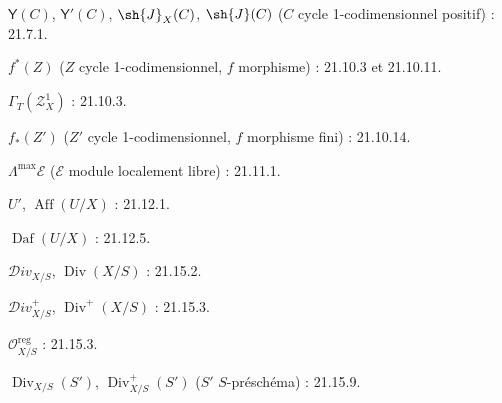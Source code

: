 $\boldsymbol{\mathsf{Y}}(C)$, $\boldsymbol{\mathsf{Y}}'(C)$, $\sh{J}_X(C)$, $\sh{J}(C)$
($C$ cycle 1-codimensionnel positif) : 21.7.1.

$f^*(Z)$ ($Z$ cycle 1-codimensionnel, $f$ morphisme) : 21.10.3 et 21.10.11.

$\varGamma_T(\mathscr Z_X^1)$ : 21.10.3.

$f_*(Z')$ ($Z'$ cycle 1-codimensionnel, $f$ morphisme fini) : 21.10.14.

$\Lambda^{\max}\mathcal E$ ($\mathcal E$ module localement libre) : 21.11.1.

$U'$, $\operatorname{Aff}(U/X)$ : 21.12.1.

$\operatorname{Daf}(U/X)$ : 21.12.5.

$\mathcal{D}iv_{X/S}$, $\operatorname{Div}(X/S)$ : 21.15.2.

$\mathcal{D}iv_{X/S}^+$, $\operatorname{Div}^+(X/S)$ : 21.15.3.

$\mathcal O_{X/S}^{\mathrm{reg}}$ : 21.15.3.

$\operatorname{Div}_{X/S}(S')$, $\operatorname{Div}_{X/S}^+(S')$
($S'$ $S$-préschéma) : 21.15.9.

\endgroup
